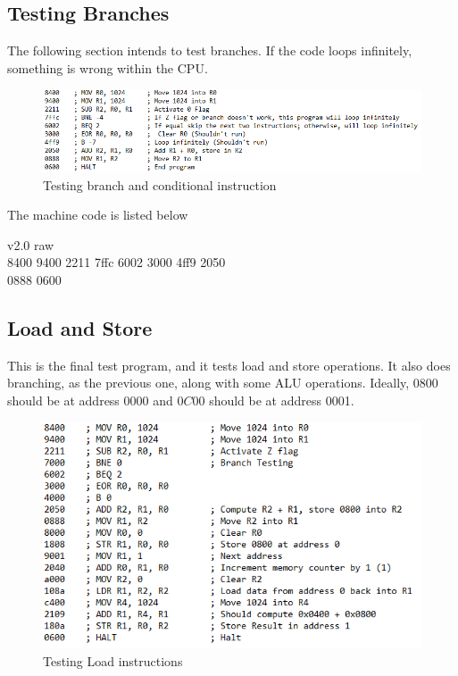 \documentclass[12pt, letter]{article}
\begin{document}
	\subsection{Testing Branches}
	The following section intends to test branches. If the code loops infinitely, something is wrong within the CPU. 
	
	\begin{figure}[h]
		\centering
		\includegraphics[scale = 1]{branchTest}
		\caption{Testing branch and conditional instruction}
		\label{fig:aluTest}
	\end{figure}

	\bigskip
	
	The machine code is listed below
	\bigskip
	\begin{tcolorbox}[colback = bg, boxrule = 0pt]
		v2.0 raw\\
		8400 9400 2211 7ffc 6002 3000 4ff9 2050\\
		0888 0600\\
	\end{tcolorbox}
	
	\subsection{Load and Store}
	This is the final test program, and it tests load and store operations. It also does branching, as the previous one, along with some ALU operations. Ideally, $0800$ should be at address 0000 and $0C00$ should be at address 0001.
	
	\begin{figure}[h]
		\centering
		\includegraphics[scale = 1]{loadTest}
		\caption{Testing Load instructions}
		\label{fig:aluTest}
	\end{figure}
\end{document}
